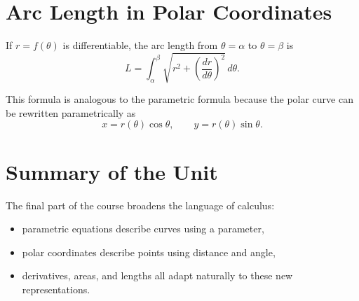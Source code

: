 \section*{Arc Length in Polar Coordinates}

If $r=f(\theta)$ is differentiable, the arc length from $\theta=\alpha$ to $\theta=\beta$ is
$$L = \int_{\alpha}^{\beta} \sqrt{r^2+\left(\frac{dr}{d\theta}\right)^2}\,d\theta.$$ 

This formula is analogous to the parametric formula because the polar curve can be rewritten parametrically as
$$x=r(\theta)\cos\theta, \qquad y=r(\theta)\sin\theta.$$ 

\section*{Summary of the Unit}

The final part of the course broadens the language of calculus:
\begin{itemize}
    \item parametric equations describe curves using a parameter,
    \item polar coordinates describe points using distance and angle,
    \item derivatives, areas, and lengths all adapt naturally to these new representations.
\end{itemize}